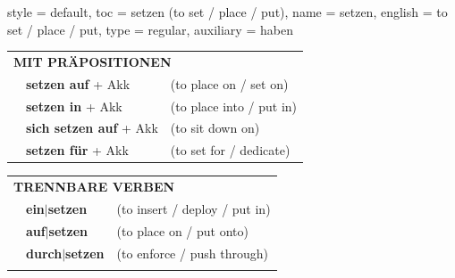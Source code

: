 \begin{verbentry}{
  style = {default},
  toc = {setzen (to set / place / put)},
  name = {setzen},
  english = {to set / place / put},
  type = {regular},
  auxiliary = {haben}
}
 \vspace{10pt}

\begin{tabular}{lll}
      \multicolumn{3}{l}{\textbf{MIT PRÄPOSITIONEN}}\\
& \textbf{setzen auf} + Akk & (to place on / set on)\\
& \textbf{setzen in} + Akk & (to place into / put in)\\
& \textbf{sich setzen auf} + Akk & (to sit down on)\\
& \textbf{setzen für} + Akk & (to set for / dedicate)\\
\end{tabular}
  \hfill
\begin{tabular}{lll}
      \multicolumn{3}{l}{\textbf{TRENNBARE VERBEN}}\\
 & \textbf{ein$|$setzen} & (to insert / deploy / put in)\\
 & \textbf{auf$|$setzen} & (to place on / put onto)\\
 & \textbf{durch$|$setzen} & (to enforce / push through)\\
\vspace{10pt}
  \end{tabular}


\vspace{-5pt}
\end{verbentry}

